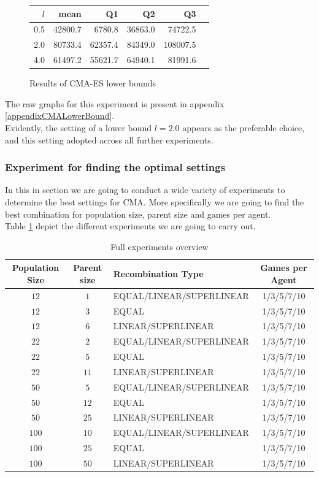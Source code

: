 \begin{figure}[H]
\centering
\begin{tabular}{r | r r r r r}
$l$ & mean & Q1 & Q2 & Q3\\
\hline
0.5 & 42800.7 & 6780.8  & 36863.0 & 74722.5\\
2.0 & 80733.4 & 62357.4 & 84349.0 & 108007.5\\
4.0 & 61497.2 & 55621.7 & 64940.1 & 81991.6\\
\end{tabular}
\caption{Results of CMA-ES lower bounds \label{CMALowerBoundConfigTest}}
\end{figure}
The raw graphs for this experiment is present in appendix \ref{appendixCMALowerBound}.\\
Evidently, the setting of a lower bound $l=2.0$ appears as the preferable choice, and this 
setting adopted across all further experiments.


\subsubsection{Experiment for finding the optimal settings}
In this in section we are going to conduct a wide variety of experiments to determine
the best settings for CMA. More specifically we are going to find the best combination for
population size, parent size and games per agent.\\
Table \ref{SuperCMAExperiment} depict the different experiments we are
going to carry out.

\begin{table}[H]
\centering
\begin{tabular}{c c l c}
Population Size & Parent size & Recombination Type & Games per Agent\\
\hline
$12$ & $1$ & EQUAL/LINEAR/SUPERLINEAR & 1/3/5/7/10\\
$12$ & $3$ & EQUAL & 1/3/5/7/10\\
$12$ & $6$ & LINEAR/SUPERLINEAR & 1/3/5/7/10\\
$22$ & $2$ & EQUAL/LINEAR/SUPERLINEAR & 1/3/5/7/10\\
$22$ & $5$ & EQUAL & 1/3/5/7/10\\
$22$ & $11$ & LINEAR/SUPERLINEAR & 1/3/5/7/10\\
$50$ & $5$ & EQUAL/LINEAR/SUPERLINEAR & 1/3/5/7/10\\
$50$ & $12$ & EQUAL & 1/3/5/7/10\\
$50$ & $25$ & LINEAR/SUPERLINEAR & 1/3/5/7/10\\
$100$ & $10$ & EQUAL/LINEAR/SUPERLINEAR & 1/3/5/7/10\\
$100$ & $25$ & EQUAL & 1/3/5/7/10\\
$100$ & $50$ & LINEAR/SUPERLINEAR & 1/3/5/7/10
\end{tabular}
\caption{Full experiments overview \label{SuperCMAExperiment}}
\end{table}


